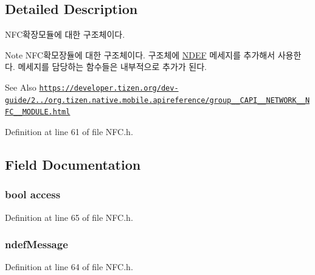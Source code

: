 \subsection{Detailed Description}
N\-F\-C확장모듈에 대한 구조체이다. 

\begin{DoxyNote}{Note}
N\-F\-C확모장듈에 대한 구조체이다. 구조체에 \hyperlink{structNDEF}{N\-D\-E\-F} 메세지를 추가해서 사용한다. 메세지를 담당하는 함수들은 내부적으로 추가가 된다. 
\end{DoxyNote}
\begin{DoxySeeAlso}{See Also}
\href{https://developer.tizen.org/dev-guide/2.3.0/org.tizen.native.mobile.apireference/group__CAPI__NETWORK__NFC__MODULE.html}{\tt https\-://developer.\-tizen.\-org/dev-\/guide/2../org.\-tizen.\-native.\-mobile.\-apireference/group\-\_\-\-\_\-\-C\-A\-P\-I\-\_\-\-\_\-\-N\-E\-T\-W\-O\-R\-K\-\_\-\-\_\-\-N\-F\-C\-\_\-\-\_\-\-M\-O\-D\-U\-L\-E.\-html} 
\end{DoxySeeAlso}


Definition at line 61 of file N\-F\-C.\-h.



\subsection{Field Documentation}
\hypertarget{structNFCExtends_ab4e2372937bb1eec89f2a954a4db6604}{
\subsubsection[{access}]{\setlength{\rightskip}{0pt plus 5cm}bool access}}\label{structNFCExtends_ab4e2372937bb1eec89f2a954a4db6604}


Definition at line 65 of file N\-F\-C.\-h.

\hypertarget{structNFCExtends_af404558710d345372ee7a9bff25f8503}{
\subsubsection[{ndef\-Message}]{ ndef\-Message}}\label{structNFCExtends_af404558710d345372ee7a9bff25f8503}


Definition at line 64 of file N\-F\-C.\-h.

